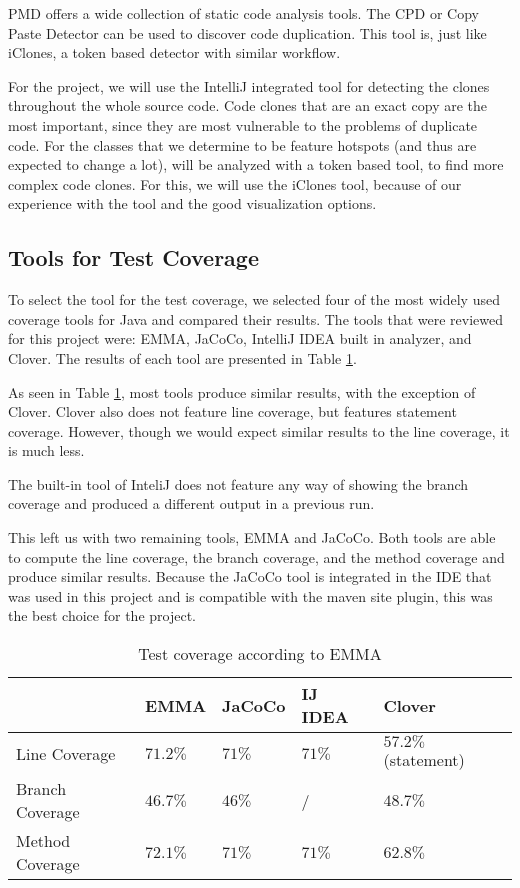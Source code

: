 \documentclass[]{article}
\begin{document}
PMD offers a wide collection of static code analysis tools. The CPD or Copy Paste Detector can be used to discover code duplication. This tool is, just like iClones, a token based detector with similar workflow. 

For the project, we will use the IntelliJ integrated tool for detecting the clones throughout the whole source code. Code clones that are an exact copy are the most important, since they are most vulnerable to the problems of duplicate code. For the classes that we determine to be feature hotspots (and thus are expected to change a lot), will be analyzed with a token based tool, to find more complex code clones. For this, we will use the iClones tool, because of our experience with the tool and the good visualization options.





\subsection{Tools for Test Coverage}
To select the tool for the test coverage, we selected four of the most widely used coverage tools for Java and compared their results. The tools that were reviewed for this project were: EMMA, JaCoCo, IntelliJ IDEA built in analyzer, and Clover. The results of each tool are presented in Table \ref{testCoverageTools}.

As seen in Table \ref{testCoverageTools}, most tools produce similar results, with the exception of Clover. Clover also does not feature line coverage, but features statement coverage. However, though we would expect similar results to the line coverage, it is much less.

The built-in tool of InteliJ does not feature any way of showing the branch coverage and produced a different output in a previous run. 

This left us with two remaining tools, EMMA and JaCoCo. Both tools are able to compute the line coverage, the branch coverage, and the method coverage and produce similar results. Because the JaCoCo tool is integrated in the IDE that was used in this project and is compatible with the maven site plugin, this was the best choice for the project. 

\begin{table}[]
	\begin{center}
		\begin{tabular}{|l||l|l|l|l|}
			\hline
			&  EMMA & JaCoCo & IJ IDEA & Clover\\ \hline\hline
			Line Coverage	& $71.2\%$ & $71\%$ & $71\%$ &  $57.2\%$ (statement)\\
			Branch Coverage	& $46.7\%$ & $46\%$ &  / & $48.7\%$\\
			Method Coverage	& $72.1\%$ & $71\%$ & $71\%$& $62.8\%$ \\ 
			\hline
		\end{tabular}
		\caption{Test coverage according to EMMA}
		\label{testCoverageTools}
	\end{center}
	
\end{table}
\end{document}
